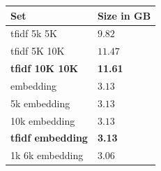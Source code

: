 \documentclass[../../Thesis.tex]{subfiles}
\begin{document}
\begin{tabular}{|l|l|}
\hline
Set & Size in GB\\
\hline
tfidf 5k 5K & $9.82$ \\
\hline
tfidf 5K 10K & $11.47$ \\
\hline
\textbf{tfidf 10K 10K} &\textbf{11.61}\\
\hline
embedding & $3.13$ \\
\hline
5k embedding & $3.13$ \\
\hline
10k embedding & $3.13$ \\
\hline
\textbf{tfidf embedding} & \textbf{3.13} \\
\hline
1k 6k embedding & $3.06$ \\
\hline
\end{tabular}
\\
\end{document}
